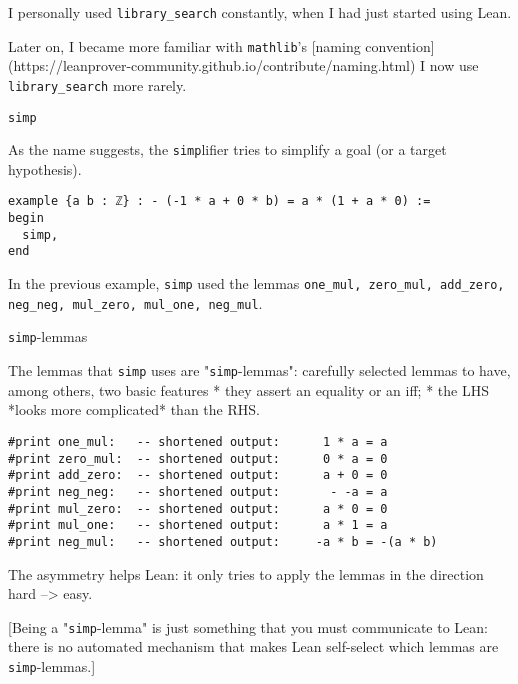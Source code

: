 \documentclass{beamer}
\begin{document}
\begin{frame}[fragile]

I personally used {\verb`library_search`} constantly, when I had just started using Lean.

Later on, I became more familiar with {\verb`mathlib`}'s [naming convention](https://leanprover-community.github.io/contribute/naming.html) I now use {\verb`library_search`} more rarely.
\end{frame}

\begin{frame}[fragile]{{\texttt{simp}}}

As the name suggests, the {\verb`simp`}lifier tries to simplify a goal (or a target hypothesis).

\begin{verbatim}
example {a b : ℤ} : - (-1 * a + 0 * b) = a * (1 + a * 0) :=
begin
  simp,
end
\end{verbatim}
In the previous example, {\verb`simp`} used the lemmas {\verb`one_mul, zero_mul, add_zero, neg_neg, mul_zero, mul_one, neg_mul`}.
\end{frame}

\begin{frame}[fragile]{{\texttt{simp}}-lemmas}

The lemmas that {\verb`simp`} uses are "{\verb`simp`}-lemmas": carefully selected lemmas to have, among others, two basic features
* they assert an equality or an iff;
* the LHS *looks more complicated* than the RHS.

\begin{verbatim}
#print one_mul:   -- shortened output:      1 * a = a
#print zero_mul:  -- shortened output:      0 * a = 0
#print add_zero:  -- shortened output:      a + 0 = 0
#print neg_neg:   -- shortened output:       - -a = a
#print mul_zero:  -- shortened output:      a * 0 = 0
#print mul_one:   -- shortened output:      a * 1 = a
#print neg_mul:   -- shortened output:     -a * b = -(a * b)
\end{verbatim}

The asymmetry helps Lean: it only tries to apply the lemmas in the direction hard --> easy.

[Being a "{\verb`simp`}-lemma" is just something that you must communicate to Lean: there is no automated mechanism that makes Lean self-select which lemmas are {\verb`simp`}-lemmas.]
\end{frame}
\end{document}
